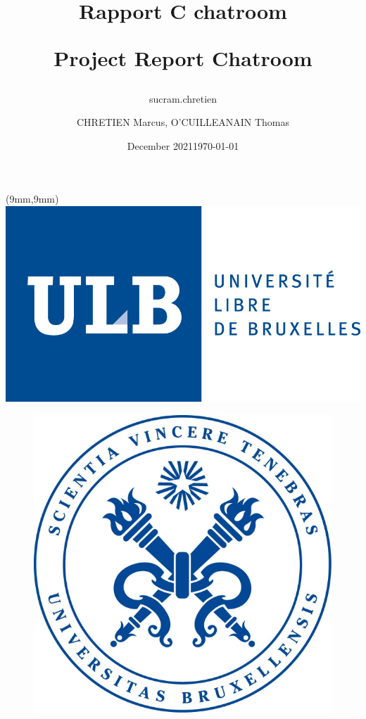 \documentclass{article}
\title{Rapport C chatroom}
\author{sucram.chretien }
\date{December 2021}
\begin{document}
\begin{titlepage}
\begin{textblock*}{5cm}(9mm,9mm)
\includegraphics[scale=0.5]{ULB.jpg}
\end{textblock*}
\author{CHRETIEN Marcus, O'CUILLEANAIN Thomas}
\date{\today}
\title{
    \begin{minipage}\linewidth
        \centering
        Project Report
        \vskip10pt
        \large\textbf{Chatroom}
    \end{minipage}
}
\maketitle
\centering
\begin{figure}[H]
  \centering
	\includegraphics[scale=0.4]{SVT.png}
  \label{fig:logo}
\end{figure}
\end{titlepage}
\end{document}
